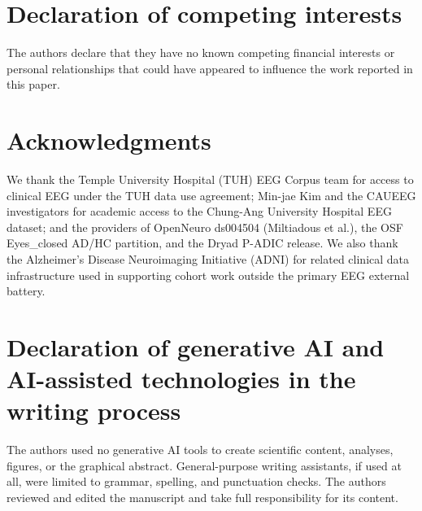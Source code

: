 \section*{Declaration of competing interests}

The authors declare that they have no known competing financial interests or personal relationships that could have appeared to influence the work reported in this paper.



\section*{Acknowledgments}

We thank the Temple University Hospital (TUH) EEG Corpus team for access to clinical EEG under the TUH data use agreement; Min-jae Kim and the CAUEEG investigators for academic access to the Chung-Ang University Hospital EEG dataset; and the providers of OpenNeuro ds004504 (Miltiadous et al.), the OSF Eyes\_closed AD/HC partition, and the Dryad P-ADIC release. We also thank the Alzheimer's Disease Neuroimaging Initiative (ADNI) for related clinical data infrastructure used in supporting cohort work outside the primary EEG external battery.

\section*{Declaration of generative AI and AI-assisted technologies in the writing process}

The authors used no generative AI tools to create scientific content, analyses, figures, or the graphical abstract. General-purpose writing assistants, if used at all, were limited to grammar, spelling, and punctuation checks. The authors reviewed and edited the manuscript and take full responsibility for its content.
